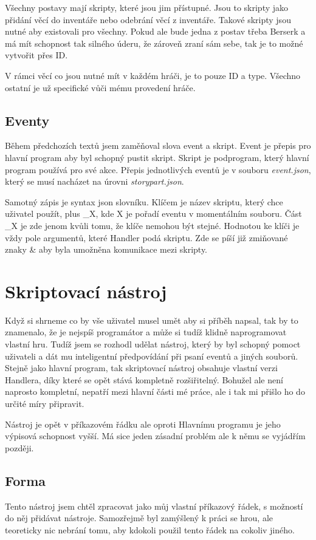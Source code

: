 \documentclass[12pt,a4paper]{article}
\begin{document}
Všechny postavy mají skripty, které jsou jim přístupné. Jsou to skripty jako přidání věcí do inventáře nebo odebrání věcí z inventáře. Takové skripty jsou nutné aby existovali pro všechny. Pokud ale bude jedna z postav třeba Berserk a má mít schopnost tak silného úderu, že zároveň zraní sám sebe, tak je to možné vytvořit přes ID. 

V rámci věcí co jsou nutné mít v každém hráči, je to pouze ID a type. Všechno ostatní je už specifické vůči mému provedení hráče.

\subsection{Eventy}
Během předchozích textů jsem zaměňoval slova event a skript. Event je přepis pro hlavní program aby byl schopný pustit skript. Skript je podprogram, který hlavní program používá pro své akce. Přepis jednotlivých eventů je v souboru \textit{event.json}, který se musí nacházet na úrovni \textit{storypart.json}.

Samotný zápis je syntax json slovníku. Klíčem je název skriptu, který chce uživatel použít, plus \_X, kde X je pořadí eventu v momentálním souboru. Část \_X je zde jenom kvůli tomu, že klíče nemohou být stejné. Hodnotou ke klíči je vždy pole argumentů, které Handler podá skriptu. Zde se píší již zmiňované znaky \& aby byla umožněna komunikace mezi skripty.

\section{Skriptovací nástroj}
Když si shrneme co by vše uživatel musel umět aby si příběh napsal, tak by to znamenalo, že je nejspíš programátor a může si tudíž klidně naprogramovat vlastní hru. Tudíž jsem se rozhodl udělat nástroj, který by byl schopný pomoct uživateli a dát mu inteligentní předpovídání při psaní eventů a jiných souborů. Stejně jako hlavní program, tak skriptovací nástroj obsahuje vlastní verzi Handlera, díky které se opět stává kompletně rozšiřitelný. Bohužel ale není naprosto kompletní, nepatří mezi hlavní části mé práce, ale i tak mi přišlo ho do určité míry připravit.

Nástroj je opět v příkazovém řádku ale oproti Hlavnímu programu je jeho výpisová schopnost vyšší. Má sice jeden zásadní problém ale k němu se vyjádřím později.

\subsection{Forma}
Tento nástroj jsem chtěl zpracovat jako můj vlastní příkazový řádek, s možností do něj přidávat nástroje. Samozřejmě byl zamýšlený k práci se hrou, ale teoreticky nic nebrání tomu, aby kdokoli použil tento řádek na cokoliv jiného. 
\end{document}
